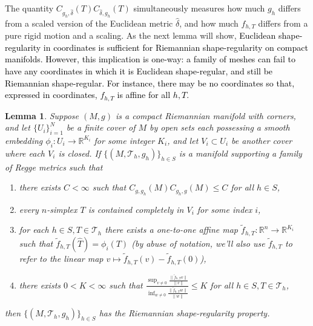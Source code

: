 \documentclass[11pt]{article}
\newtheorem{lemma}[theorem]{Lemma}
\newcommand{\correction}[2]{\textcolor{red}{}\textcolor{black}{#2}}
\begin{document}
The quantity $C_{g_h,\hat \delta}(T)C_{\hat \delta,g_h}(T)$ simultaneously measures how much $g_h$ differs from a scaled version of the Euclidean metric $\hat \delta$, and how much $f_{h,T}$ differs from a pure rigid motion and a scaling. As the next lemma will show, \correction{if a family of meshes on a compact manifold is piecewise-affine in some smooth curvilinear coordinates and shape-regular (in the Euclidean sense) when viewed in those coordinates, and the metrics $g_h$ differ from a smooth metric $g$ by a bounded amount, then the family of meshes is also shape-regular in the Riemannian sense.}{Euclidean shape-regularity in coordinates is sufficient for Riemannian shape-regularity on compact manifolds. However, this implication is one-way: a family of meshes can fail to have any coordinates in which it is Euclidean shape-regular, and still be Riemannian shape-regular. For instance, there may be no coordinates so that, expressed in coordinates, $f_{h,T}$ is affine for all $h,T$.}

\begin{lemma}
\label{shapereg}
Suppose $(M,g)$ is a compact Riemannian manifold with corners, and let $\{U_i\}_{i = 1}^N$ be a finite cover of $M$ by open sets each possessing a smooth embedding $\phi_i: U_i \to \mathbb{R}^{K_i}$ for some integer $K_i$, and let $V_i \subset U_i$ be another cover where each $V_i$ is closed. If $\{(M,\mathcal{T}_h,g_h)\}_{h \in S}$ is a manifold supporting a family of Regge metrics such that

\begin{enumerate}
\item{there exists $C < \infty$ such that $C_{g,g_h}(M)C_{g_h,g}(M) \le C$ for all $h \in S$,}
\item{every $n$-simplex $T$ is contained completely in $V_i$ for some index $i$,} 
\item{for each $h \in S, T \in \mathcal{T}_h$ there exists a one-to-one affine map $\tilde{f}_{h,T}: \mathbb{R}^n \to \mathbb{R}^{K_i}$ such that $\tilde{f}_{h,T}(\hat T) = \phi_i(T)$ (by abuse of notation, we'll also use $\tilde{f}_{h,T}$ to refer to the linear map $v \mapsto \tilde{f}_{h,T}(v) - \tilde{f}_{h,T}(0)$),}

\item{there exists $0 < K < \infty$ such that $\frac{\sup_{v \ne 0}\frac{\|\tilde{f}_{h,T}v\|}{\|v\|}}{\inf_{w \ne 0}\frac{\|\tilde{f}_{h,T}w\|}{\|w\|}} \le K$ for all $h \in S, T \in \mathcal{T}_h$,}
\end{enumerate}
 then $\{(M,\mathcal{T}_h,g_h)\}_{h \in S}$ has the Riemannian shape-regularity property.
\end{lemma}
\end{document}
